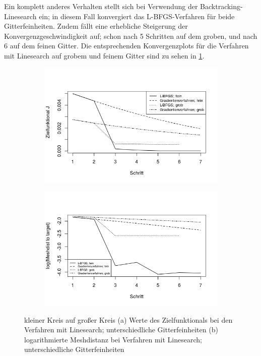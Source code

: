 Ein komplett anderes Verhalten stellt sich bei Verwendung der Backtracking-Linesearch ein; in diesem Fall konvergiert das L-BFGS-Verfahren für beide Gitterfeinheiten.
Zudem fällt eine erhebliche Steigerung der Konvergenzgeschwindigkeit auf; schon nach 5 Schritten auf dem groben, und nach 6 auf dem feinen Gitter. Die entsprechenden Konvergenzplots für die Verfahren mit Linesearch auf grobem und feinem Gitter sind zu sehen in \ref{Konvplots_circle}.

\begin{figure}
	\begin{subfigure}{0.5\textwidth}
	\centering
	\includegraphics[scale=0.48]{plot_circle_target.jpeg}
	\caption{}	
	\end{subfigure}
	\begin{subfigure}{0.5\textwidth}
	\centering
	\includegraphics[scale=0.48]{plot_circle_meshdist.jpeg}
	\caption{}	
	\end{subfigure}
\caption{kleiner Kreis auf großer Kreis (a) Werte des Zielfunktionals bei den Verfahren mit Linesearch; unterschiedliche Gitterfeinheiten (b) logarithmierte Meshdistanz bei Verfahren mit Linesearch; unterschiedliche Gitterfeinheiten}
\label{Konvplots_circle}
\end{figure}

